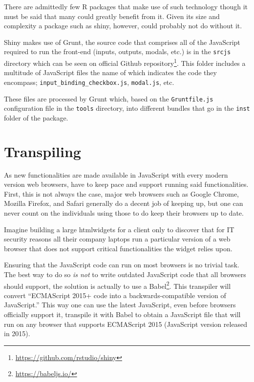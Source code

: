 \documentclass[
]{krantz}
\renewcommand{\href}[2]{#2\footnote{\url{#1}}}
\begin{document}
There are admittedly few R packages that make use of such technology though it must be said that many could greatly benefit from it. Given its size and complexity a package such as shiny, however, could probably not do without it.

Shiny makes use of Grunt, the source code that comprises all of the JavaScript required to run the front-end (inputs, outputs, modals, etc.) is in the \texttt{srcjs} directory which can be seen on \href{https://github.com/rstudio/shiny}{official Github repository}. This folder includes a multitude of JavaScript files the name of which indicates the code they encompass; \texttt{input\_binding\_checkbox.js}, \texttt{modal.js}, etc.

These files are processed by Grunt which, based on the \texttt{Gruntfile.js} configuration file in the \texttt{tools} directory, into different bundles that go in the \texttt{inst} folder of the package.

\hypertarget{webpack-browser}{%
\section{Transpiling}\label{webpack-browser}}

As new functionalities are made available in JavaScript with every modern version web browsers, have to keep pace and support running said functionalities. First, this is not always the case, major web browsers such as Google Chrome, Mozilla Firefox, and Safari generally do a decent job of keeping up, but one can never count on the individuals using those to do keep their browsers up to date.

Imagine building a large htmlwidgets for a client only to discover that for IT security reasons all their company laptops run a particular version of a web browser that does not support critical functionalities the widget relies upon.

Ensuring that the JavaScript code can run on most browsers is no trivial task. The best way to do so \emph{is not} to write outdated JavaScript code that all browsers should support, the solution is actually to use a \href{https://babeljs.io/}{Babel}. This transpiler will convert ``ECMAScript 2015+ code into a backwards-compatible version of JavaScript.'' This way one can use the latest JavaScript, even before browsers officially support it, transpile it with Babel to obtain a JavaScript file that will run on any browser that supports ECMAScript 2015 (JavaScript version released in 2015).
\end{document}
